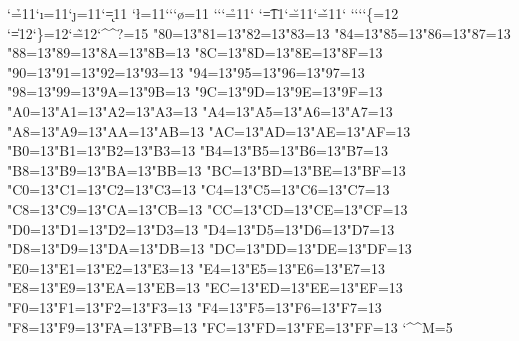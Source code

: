{\catcode`\h=11\catcode`\i=11\catcode`\j=11\catcode`\k=11%
\catcode`\l=11\catcode`\catcode`\catcode`\o=11%
\catcode`\catcode`\catcode`\r=11\catcode`%
\catcode`\t=11\catcode`\u=11\catcode`\v=11\catcode`%
\catcode`\catcode`\catcode`\catcode`\{=12%
\catcode`\|=12\catcode`\}=12\catcode`\~=12\catcode`\^^?=15%
\catcode"80=13\catcode"81=13\catcode"82=13\catcode"83=13%
\catcode"84=13\catcode"85=13\catcode"86=13\catcode"87=13%
\catcode"88=13\catcode"89=13\catcode"8A=13\catcode"8B=13%
\catcode"8C=13\catcode"8D=13\catcode"8E=13\catcode"8F=13%
\catcode"90=13\catcode"91=13\catcode"92=13\catcode"93=13%
\catcode"94=13\catcode"95=13\catcode"96=13\catcode"97=13%
\catcode"98=13\catcode"99=13\catcode"9A=13\catcode"9B=13%
\catcode"9C=13\catcode"9D=13\catcode"9E=13\catcode"9F=13%
\catcode"A0=13\catcode"A1=13\catcode"A2=13\catcode"A3=13%
\catcode"A4=13\catcode"A5=13\catcode"A6=13\catcode"A7=13%
\catcode"A8=13\catcode"A9=13\catcode"AA=13\catcode"AB=13%
\catcode"AC=13\catcode"AD=13\catcode"AE=13\catcode"AF=13%
\catcode"B0=13\catcode"B1=13\catcode"B2=13\catcode"B3=13%
\catcode"B4=13\catcode"B5=13\catcode"B6=13\catcode"B7=13%
\catcode"B8=13\catcode"B9=13\catcode"BA=13\catcode"BB=13%
\catcode"BC=13\catcode"BD=13\catcode"BE=13\catcode"BF=13%
\catcode"C0=13\catcode"C1=13\catcode"C2=13\catcode"C3=13%
\catcode"C4=13\catcode"C5=13\catcode"C6=13\catcode"C7=13%
\catcode"C8=13\catcode"C9=13\catcode"CA=13\catcode"CB=13%
\catcode"CC=13\catcode"CD=13\catcode"CE=13\catcode"CF=13%
\catcode"D0=13\catcode"D1=13\catcode"D2=13\catcode"D3=13%
\catcode"D4=13\catcode"D5=13\catcode"D6=13\catcode"D7=13%
\catcode"D8=13\catcode"D9=13\catcode"DA=13\catcode"DB=13%
\catcode"DC=13\catcode"DD=13\catcode"DE=13\catcode"DF=13%
\catcode"E0=13\catcode"E1=13\catcode"E2=13\catcode"E3=13%
\catcode"E4=13\catcode"E5=13\catcode"E6=13\catcode"E7=13%
\catcode"E8=13\catcode"E9=13\catcode"EA=13\catcode"EB=13%
\catcode"EC=13\catcode"ED=13\catcode"EE=13\catcode"EF=13%
\catcode"F0=13\catcode"F1=13\catcode"F2=13\catcode"F3=13%
\catcode"F4=13\catcode"F5=13\catcode"F6=13\catcode"F7=13%
\catcode"F8=13\catcode"F9=13\catcode"FA=13\catcode"FB=13%
\catcode"FC=13\catcode"FD=13\catcode"FE=13\catcode"FF=13%
\firstline}%
\catcode`\^^M=5%



